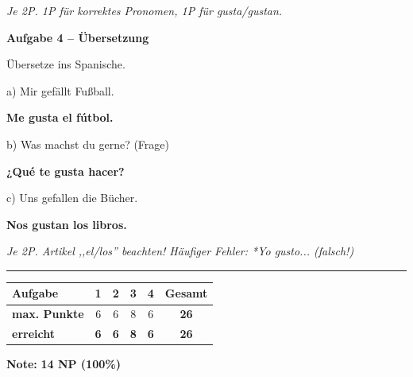 \documentclass[11pt, a4paper]{article}
\newcommand{\fachfarbe}{spanisch}
\newcommand{\punktebox}[1]{\hfill\fbox{\small \_/#1}}
\newcommand{\lsg}[1]{\textcolor{loesung}{\textbf{#1}}}
\newenvironment{aufgabe}[1]{%
    \needspace{5\baselineskip}%
    \nopagebreak[4]%
    \vspace{10pt}
    \noindent\textbf{\textcolor{\fachfarbe}{Aufgabe #1}}
    \nopagebreak[4]%
    \vspace{5pt}
    \nopagebreak[4]%
    \begin{list}{}{\leftmargin=0pt}
    \item[]
}{%
    \end{list}
}
\begin{document}
\textit{\textcolor{grau}{Je 2P. 1P für korrektes Pronomen, 1P für gusta/gustan.}}

\vspace{15pt}


\begin{aufgabe}{4 -- Übersetzung}
Übersetze ins Spanische. \punktebox{6}
\end{aufgabe}

\noindent
a) Mir gefällt Fußball.

\lsg{Me gusta el fútbol.}

\vspace{1em}

\noindent
b) Was machst du gerne? (Frage)

\lsg{¿Qué te gusta hacer?}

\vspace{1em}

\noindent
c) Uns gefallen die Bücher.

\lsg{Nos gustan los libros.}

\textit{\textcolor{grau}{Je 2P. Artikel ,,el/los'' beachten! Häufiger Fehler: *Yo gusto... (falsch!)}}


\vspace{25pt}
\hrule
\vspace{10pt}

\noindent
\begin{tabularx}{\textwidth}{|X|c|c|c|c||c|}
\hline
\textbf{Aufgabe} & 1 & 2 & 3 & 4 & \textbf{Gesamt} \\
\hline
\textbf{max. Punkte} & 6 & 6 & 8 & 6 & \textbf{26} \\
\hline
\textbf{erreicht} & \lsg{6} & \lsg{6} & \lsg{8} & \lsg{6} & \lsg{26} \\[0.8em]
\hline
\end{tabularx}

\vspace{10pt}

\begin{flushright}
\textbf{Note:} \lsg{14 NP (100\%)}
\end{flushright}
\end{document}
